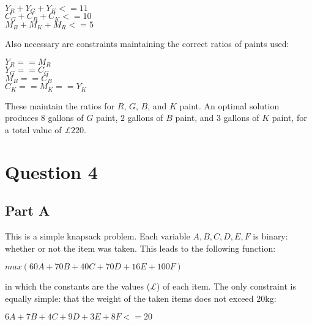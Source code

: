 \documentclass[11pt]{article} %
\begin{document}
\begin {center}

$Y_R + Y_G + Y_K <= 11$ \\
$C_G + C_B + C_K <= 10$ \\
$M_B + M_K +M_R <= 5$ \\

\end{center}

Also necessary are constraints maintaining the correct ratios of paints used:

\begin{center}

$Y_R == M_R$ \\
$Y_G == C_G$ \\
$M_B == C_B$ \\
$C_K == M_K == Y_K$ \\

\end{center}

These maintain the ratios for $R$, $G$, $B$, and $K$ paint. An optimal solution produces $8$ gallons of $G$ paint, $2$ gallons of $B$ paint, and $3$ gallons of $K$ paint, for a total value of \textit{£}$220$.

\clearpage

\section*{Question 4}

\subsection*{Part A} 

This is a simple knapsack problem. Each variable $A, B, C, D, E, F$ is binary: whether or not the item was taken. This leads to the following function:

\begin{center}

$max (60A + 70B + 40C + 70D + 16E + 100F)$

\end{center}

in which the constants are the values (\textit{£}) of each item. The only constraint is equally simple: that the weight of the taken items does not exceed $20$kg:

\begin{center}

$6A + 7B + 4C + 9D + 3E + 8F <= 20$

\end{center}
\end{document}
